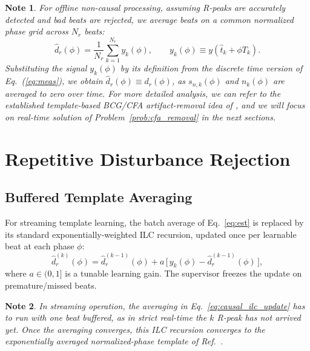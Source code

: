 \documentclass[conference]{IEEEtran}
\newtheorem{noteenv}{Note}
\newcommand{\dhat}{\widehat{d}}
\begin{document}
\begin{noteenv}\label{note:template_window_choice}
For offline non-causal processing, assuming R-peaks are accurately detected and bad beats are rejected, we average beats on a common
normalized phase grid across $N_r$ beats:
\begin{equation}
\dhat_r(\phi) = \frac{1}{N_r}\sum_{k=1}^{N_r} y_k(\phi),
\qquad
y_k(\phi) \equiv y\!\left(\hat t_k + \phi T_k\right).
\label{eq:est}
\end{equation}
Substituting the signal $y_k(\phi)$ by its definition from the discrete time version of Eq.~(\ref{eq:meas}), we obtain
$\dhat_r(\phi) \equiv d_r(\phi)$, as $s_{n,k}(\phi)$ and $n_k(\phi)$ are averaged to zero over time.
For more detailed analysis, we can refer to the established template-based BCG/CFA artifact-removal
idea of \cite{allen1998}, and we will focus on real-time solution of Problem~\ref{prob:cfa_removal} in the next sections.
\end{noteenv}

\section{Repetitive Disturbance Rejection}
\label{sec:noncausal_repetitive_rejection}



\subsection{Buffered Template Averaging}





For streaming template learning, the batch average of Eq.~\eqref{eq:est} is replaced by its standard
exponentially-weighted ILC recursion, updated once per learnable beat at each phase $\phi$:
\begin{equation}
\hat{d}_r^{(k)}(\phi) = \hat{d}_r^{(k-1)}(\phi) + a\,\bigl[\,y_k(\phi) - \hat{d}_r^{(k-1)}(\phi)\,\bigr],
\label{eq:causal_ilc_update}
\end{equation}
where $a\in(0,1]$ is a tunable learning gain. The supervisor freezes the update on
premature/missed beats.
\begin{noteenv}
  In streaming operation, the averaging in Eq.~\eqref{eq:causal_ilc_update} has to
run with one beat buffered, as in strict real-time the $k$ R-peak has not arrived yet.
Once the averaging converges, this ILC recursion converges to the exponentially averaged normalized-phase template of Ref.~\cite{allen1998}.
\end{noteenv}
\end{document}
